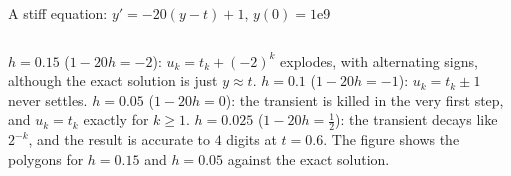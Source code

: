 \documentclass[11pt]{article}
\begin{document}
\begin{exmp}{A stiff equation: $y'=-20(y-t)+1$, $y(0)=1$}{e9}
\begin{center}
\begin{tabular}{cccc}
\bottomrule
\end{tabular}
\end{center}
$h=0.15$ ($1-20h=-2$): $u_k=t_k+(-2)^k$ explodes, with alternating signs, although the exact solution is just $y\approx t$. $h=0.1$ ($1-20h=-1$): $u_k=t_k\pm1$ never settles. $h=0.05$ ($1-20h=0$): the transient is killed in the very first step, and $u_k=t_k$ exactly for $k\ge1$. $h=0.025$ ($1-20h=\frac12$): the transient decays like $2^{-k}$, and the result is accurate to $4$ digits at $t=0.6$. The figure shows the polygons for $h=0.15$ and $h=0.05$ against the exact solution.
\begin{center}
\end{center}
\end{exmp}
\end{document}
